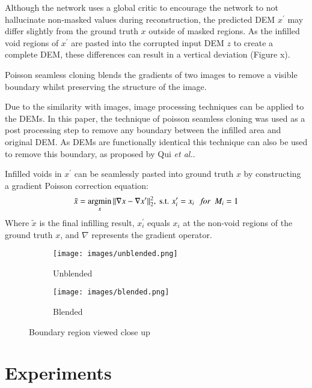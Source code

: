 \documentclass[twocolumn]{article}
\begin{document}
Although the network uses a global critic to encourage the network to not hallucinate non-masked values during reconstruction, the predicted DEM \(x^\prime\) may differ slightly from the ground truth \(x\) outside of masked regions.
As the infilled void regions of \(x^\prime\) are pasted into the corrupted input DEM \(z\) to create a complete DEM, these differences can result in a vertical deviation (Figure x).

Poisson seamless cloning\autocite{perezPoissonImageEditing2003} blends the gradients of two images to remove a visible boundary whilst preserving the structure of the image.

Due to the similarity with images, image processing techniques can be applied to the DEMs.
In this paper, the technique of poisson seamless cloning\autocite{perezPoissonImageEditing2003} was used as a post processing step to remove any boundary between the infilled area and original DEM.
As DEMs are functionally identical this technique can also be used to remove this boundary, as proposed by Qui \emph{et al.}\autocite{qiuVoidFillingDigital2019}.

Infilled voids in \(x^\prime\) can be seamlessly pasted into ground truth \(x\) by constructing a gradient Poisson correction equation:
\begin{equation}
\tilde{x} = \operatorname*{argmin}_x \Vert \nabla x - \nabla x^\prime \Vert^2_2, \text{ s.t. } x^\prime_i = x_i  \text{ \space \space \it{for} \space } M_i = 1
\end{equation}
Where \(\tilde{x}\) is the final infilling result, \(x^\prime_i\) equals \(x_i\) at the non-void regions of the ground truth \(x\), and \(\nabla\) represents the gradient operator.

\begin{figure}
\centering
\begin{subfigure}{0.4\textwidth}
    \caption{Unblended}
    \texttt{[image: images/unblended.png]}
    \label{fig:unblended}
\end{subfigure}
\hfill
\begin{subfigure}{0.4\textwidth}
    \caption{Blended}
    \texttt{[image: images/blended.png]}
    \label{fig:blended}
\end{subfigure}
\caption{Boundary region viewed close up}
\label{fig:poisson}
\end{figure}


\section{Experiments}
\label{sec:org6486c89}
\end{document}

